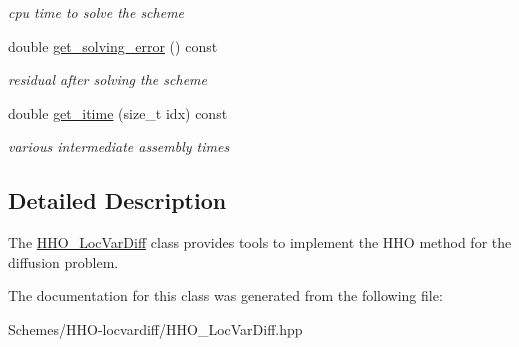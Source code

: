 \begin{DoxyCompactItemize}
\begin{DoxyCompactList}\small\item\em cpu time to solve the scheme \end{DoxyCompactList}\item 
double \hyperlink{group__HHO__LocVarDiff_ga9648b003ca1d519794bcc5407c8ce606}{get\+\_\+solving\+\_\+error} () const
\begin{DoxyCompactList}\small\item\em residual after solving the scheme \end{DoxyCompactList}\item 
double \hyperlink{group__HHO__LocVarDiff_ga61e65ce589db4203515ae8e1f5c30d0f}{get\+\_\+itime} (size\+\_\+t idx) const
\begin{DoxyCompactList}\small\item\em various intermediate assembly times \end{DoxyCompactList}\end{DoxyCompactItemize}


\subsection{Detailed Description}
The \hyperlink{classHArDCore2D_1_1HHO__LocVarDiff}{H\+H\+O\+\_\+\+Loc\+Var\+Diff} class provides tools to implement the H\+HO method for the diffusion problem. 

The documentation for this class was generated from the following file\+:\begin{DoxyCompactItemize}
\item 
Schemes/\+H\+H\+O-\/locvardiff/H\+H\+O\+\_\+\+Loc\+Var\+Diff.\+hpp\end{DoxyCompactItemize}
